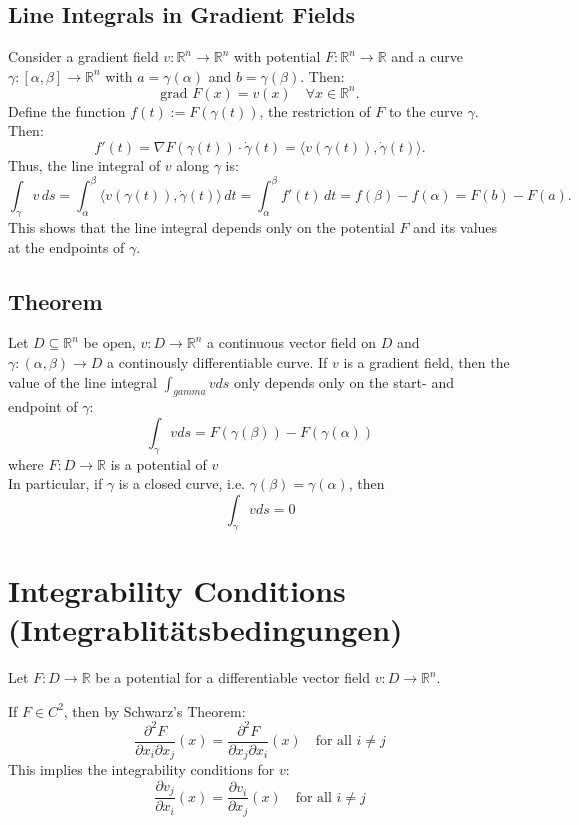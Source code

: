\documentclass{article}
\begin{document}
\subsection{Line Integrals in Gradient Fields}
Consider a gradient field \( v: \mathbb{R}^n \rightarrow \mathbb{R}^n \) with potential \( F : \mathbb{R}^n \rightarrow \mathbb{R} \) and a curve \( \gamma : [\alpha, \beta] \rightarrow \mathbb{R}^n \) with \( a = \gamma(\alpha) \) and \( b = \gamma(\beta) \). Then:
\[
\text{grad } F(x) = v(x) \quad \forall x \in \mathbb{R}^n.
\]
Define the function \( f(t) := F(\gamma(t)) \), the restriction of \( F \) to the curve \( \gamma \). Then:
\[
f'(t) = \nabla F(\gamma(t)) \cdot \dot{\gamma}(t) = \langle v(\gamma(t)), \dot{\gamma}(t) \rangle.
\]
Thus, the line integral of \( v \) along \( \gamma \) is:
\[
\int_{\gamma} v \, ds = \int_{\alpha}^{\beta} \langle v(\gamma(t)), \dot{\gamma}(t) \rangle \, dt = \int_{\alpha}^{\beta} f'(t) \, dt = f(\beta) - f(\alpha) = F(b) - F(a).
\]
This shows that the line integral depends only on the potential \( F \) and its values at the endpoints of \( \gamma \).
\newpage
\subsection{Theorem}
Let $ D \subseteq \mathbb{R}^{n}$ be open, $v : D \rightarrow \mathbb{R}^{n}$ a continuous vector field on $D$ and $\gamma : (\alpha, \beta) \rightarrow D$ a continously differentiable curve. If $v$ is a gradient field, then the value of the line integral $\int_{gamma} v ds$ only depends only on the start- and endpoint of $\gamma$:
\[
\int_{\gamma} v ds = F(\gamma(\beta)) - F(\gamma(\alpha))
\]
where $F : D \rightarrow \mathbb{R}$ is a potential of $v$ \\
In particular, if $\gamma$ is a closed curve, i.e. $\gamma(\beta) = \gamma(\alpha)$, then \[\int_{\gamma} v ds = 0\]
\vspace{5mm}
\section{Integrability Conditions (Integrablitätsbedingungen)}
Let \( F : D \rightarrow \mathbb{R} \) be a potential for a differentiable vector field \( v : D \rightarrow \mathbb{R}^n \).

If \( F \in C^2 \), then by Schwarz's Theorem:
\[
\frac{\partial^2 F}{\partial x_i \partial x_j} (x) = \frac{\partial^2 F}{\partial x_j \partial x_i} (x) \quad \text{for all } i \neq j
\]
This implies the integrability conditions for \( v \):
\[
\frac{\partial v_j}{\partial x_i} (x) = \frac{\partial v_i}{\partial x_j} (x) \quad \text{for all } i \neq j
\]
\end{document}
